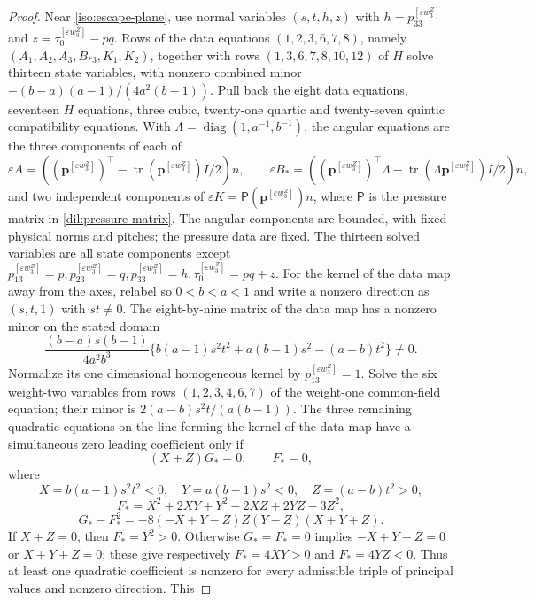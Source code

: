 \documentclass[11pt,a4paper]{article}
\numberwithin{equation}{section}
\theoremstyle{plain}
\theoremstyle{definition}
\theoremstyle{remark}
\begin{document}
\begin{proof}
Near \eqref{iso:escape-plane}, use normal variables
$(s,t,h,z)$ with $h=p_{33}^{[\varepsilon w_3^Z]}$ and $z=\tau_0^{[\varepsilon w_3^Z]}-pq$.
Rows of the data equations $(1,2,3,6,7,8)$, namely
$(A_1,A_2,A_3,B_{*3},K_1,K_2)$,
together with rows $(1,3,6,7,8,10,12)$ of $H$ solve thirteen state variables, with
nonzero combined minor
$-(b-a)(a-1)/(4a^2(b-1))$.
Pull back the eight data equations, seventeen $H$ equations, three cubic,
twenty-one quartic and twenty-seven quintic compatibility equations.
With
$\Lambda=\operatorname{diag}(1,a^{-1},b^{-1})$, the angular equations
are the three components of each of
\begin{equation}\label{appiso:angular-observations}
 \varepsilon A=((\boldsymbol p^{[\varepsilon w_3^Z]})^{\top}-\operatorname{tr}(\boldsymbol p^{[\varepsilon w_3^Z]})I/2)n,\qquad
 \varepsilon B_*=((\boldsymbol p^{[\varepsilon w_3^Z]})^{\top}\Lambda-\operatorname{tr}(\Lambda \boldsymbol p^{[\varepsilon w_3^Z]})I/2)n,
\end{equation}
and two independent components of
$\varepsilon K=\mathsf P(\boldsymbol p^{[\varepsilon w_3^Z]})n$,
where $\mathsf P$ is the pressure matrix in \eqref{dil:pressure-matrix}.
The angular components are bounded, with fixed physical norms and pitches; the pressure data are fixed.  The thirteen solved variables
are all state components except
$p_{13}^{[\varepsilon w_3^Z]}=p,p_{23}^{[\varepsilon w_3^Z]}=q,p_{33}^{[\varepsilon w_3^Z]}=h,\tau_0^{[\varepsilon w_3^Z]}=pq+z$.
For the kernel of the data map away from the axes, relabel so $0<b<a<1$ and write a nonzero
direction as $(s,t,1)$ with $st\ne0$.  The eight-by-nine matrix of the data map has a nonzero minor on the stated domain
\[
 \frac{(b-a)s(b-1)}{4a^2b^3}
 \{b(a-1)s^2t^2+a(b-1)s^2-(a-b)t^2\}\ne0.
\]
Normalize its one dimensional homogeneous kernel by $p_{13}^{[\varepsilon w_3^Z]}=1$.
Solve the six weight-two variables from rows $(1,2,3,4,6,7)$ of the
weight-one common-field equation; their minor is
$2(a-b)s^2t/(a(b-1))$.  The three remaining quadratic equations on the
line forming the kernel of the data map have a simultaneous zero leading coefficient
only if
\[
 (X+Z)G_*=0,\qquad F_*=0,
\]
where
\[
 X=b(a-1)s^2t^2<0,\quad Y=a(b-1)s^2<0,\quad Z=(a-b)t^2>0,
\]
\[
 F_*=X^2+2XY+Y^2-2XZ+2YZ-3Z^2,
\]
\[
 G_*-F_*^2=-8(-X+Y-Z)Z(Y-Z)(X+Y+Z).
\]
If $X+Z=0$, then $F_*=Y^2>0$.  Otherwise $G_*=F_*=0$ implies
$-X+Y-Z=0$ or $X+Y+Z=0$; these give respectively
$F_*=4XY>0$ and $F_*=4YZ<0$.  Thus at least one quadratic coefficient
is nonzero for every admissible triple of principal values and nonzero direction.  This

\end{proof}
\end{document}
